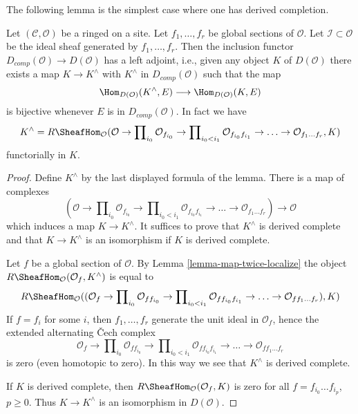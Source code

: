 \noindent
The following lemma is the simplest case where one has derived completion.

\begin{lemma}
\label{lemma-derived-completion}
Let $(\mathcal{C}, \mathcal{O})$ be a ringed on a site. Let $f_1, \ldots, f_r$
be global sections of $\mathcal{O}$. Let $\mathcal{I} \subset \mathcal{O}$ be
the ideal sheaf generated by $f_1, \ldots, f_r$.
Then the inclusion functor $D_{comp}(\mathcal{O}) \to D(\mathcal{O})$
has a left adjoint, i.e., given any object $K$ of $D(\mathcal{O})$
there exists a map $K \to K^\wedge$ with $K^\wedge$ in $D_{comp}(\mathcal{O})$
such that the map
$$
\Hom_{D(\mathcal{O})}(K^\wedge, E) \longrightarrow \Hom_{D(\mathcal{O})}(K, E)
$$
is bijective whenever $E$ is in $D_{comp}(\mathcal{O})$. In fact
we have
$$
K^\wedge =
R\SheafHom_\mathcal{O}
(\mathcal{O} \to \prod\nolimits_{i_0} \mathcal{O}_{f_{i_0}} \to
\prod\nolimits_{i_0 < i_1} \mathcal{O}_{f_{i_0}f_{i_1}} \to
\ldots \to \mathcal{O}_{f_1\ldots f_r}, K)
$$
functorially in $K$.
\end{lemma}

\begin{proof}
Define $K^\wedge$ by the last displayed formula of the lemma.
There is a map of complexes
$$
(\mathcal{O} \to \prod\nolimits_{i_0} \mathcal{O}_{f_{i_0}} \to
\prod\nolimits_{i_0 < i_1} \mathcal{O}_{f_{i_0}f_{i_1}} \to
\ldots \to \mathcal{O}_{f_1\ldots f_r}) \longrightarrow \mathcal{O}
$$
which induces a map $K \to K^\wedge$. It suffices to prove that
$K^\wedge$ is derived complete and that $K \to K^\wedge$ is an
isomorphism if $K$ is derived complete.

\medskip\noindent
Let $f$ be a global section of $\mathcal{O}$.
By Lemma \ref{lemma-map-twice-localize} the object
$R\SheafHom_\mathcal{O}(\mathcal{O}_f, K^\wedge)$
is equal to
$$
R\SheafHom_\mathcal{O}(
(\mathcal{O}_f \to \prod\nolimits_{i_0} \mathcal{O}_{ff_{i_0}} \to
\prod\nolimits_{i_0 < i_1} \mathcal{O}_{ff_{i_0}f_{i_1}} \to
\ldots \to \mathcal{O}_{ff_1\ldots f_r}), K)
$$
If $f = f_i$ for some $i$, then $f_1, \ldots, f_r$ generate the
unit ideal in $\mathcal{O}_f$, hence the extended alternating
{\v C}ech complex
$$
\mathcal{O}_f \to \prod\nolimits_{i_0} \mathcal{O}_{ff_{i_0}} \to
\prod\nolimits_{i_0 < i_1} \mathcal{O}_{ff_{i_0}f_{i_1}} \to
\ldots \to \mathcal{O}_{ff_1\ldots f_r}
$$
is zero (even homotopic to zero). In this way we see that $K^\wedge$
is derived complete.

\medskip\noindent
If $K$ is derived complete, then $R\SheafHom_\mathcal{O}(\mathcal{O}_f, K)$
is zero for all $f = f_{i_0} \ldots f_{i_p}$, $p \geq 0$. Thus
$K \to K^\wedge$ is an isomorphism in $D(\mathcal{O})$.
\end{proof}

